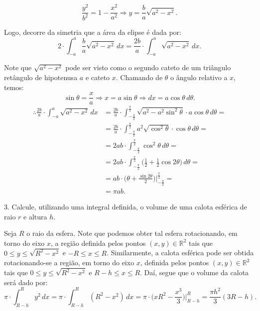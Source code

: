 \documentclass{article}
\begin{document}
{\begin{newpage}
\begin{equation*}\displaystyle{\frac{y^2}{b^2} = 1 - \frac{x^2}{a^2} \Rightarrow y = \frac{b}{a}\sqrt{a^{2} - x^{2}} .}\end{equation*}
\par Logo, decorre da simetria que a área da elipse é dada por:
\begin{equation*}\displaystyle{2\cdot\int_{-a}^{a}\frac{b}{a}\sqrt{a^2 - x^2}\, dx = \frac{2b}{a}\cdot\int_{-a}^{a} \sqrt{a^2 - x^2}\, dx .}\end{equation*}
\par Note que $\displaystyle{\sqrt{a^2 - x^2}}$ pode ser visto como o segundo cateto de um triângulo retângulo de hipotenusa $a$ e cateto $x$. Chamando de $\theta $ o ângulo relativo a $x$, temos:
\begin{equation*}\displaystyle{\sin{\theta } = \frac{x}{a} \Rightarrow x = a\sin{\theta } \Rightarrow dx = a\cos{\theta }\, d\theta .}\end{equation*}
$$\displaystyle{\begin{split}\therefore \frac{2b}{a}\cdot\int_{-a}^{a} \sqrt{a^2 - x^2}\, dx &= \frac{2b}{a}\cdot\int_{-\frac{\pi }{2}}^{\frac{\pi }{2}} \sqrt{a^2 - a^{2}\sin^{2}{\theta }} \cdot a\cos{\theta } \, d\theta = \\ &= \frac{2b}{a}\cdot\int_{-\frac{\pi }{2}}^{\frac{\pi }{2}} a^{2}\sqrt{\cos^{2}{\theta }} \cdot\cos{\theta }\, d\theta = \\ &= 2ab\cdot\int_{-\frac{\pi }{2}}^{\frac{\pi }{2}} \cos^{2}{\theta }\, d\theta = \\ &= 2ab\cdot\int_{-\frac{\pi }{2}}^{\frac{\pi }{2}} \Big(\frac{1}{2} + \frac{1}{2}\cos{2\theta }\Big)\,  d\theta = \\ &= ab\cdot\Big(\theta + \frac{\sin{2\theta }}{2}\Big)\Big|_{-\frac{\pi }{2}}^{\frac{\pi }{2}} = \\ &= \pi ab .\end{split}}$$
\par
\vspace{0.3cm}
\begin{flushleft}
3. Calcule, utilizando uma integral definida, o volume de uma calota esférica de raio $r$ e altura $h$.
\end{flushleft}
\par
Seja $R$ o raio da esfera. Note que podemos obter tal esfera rotacionando, em torno do eixo $x$, a região definida pelos pontos $(x,y)\in\mathbb{R}^2$ tais que $\displaystyle{0\leq y \leq\sqrt{R^{2} - x^{2}}}$ e $\displaystyle{-R\leq x\leq R}$. Similarmente, a calota esférica pode ser obtida rotacionando-se a região, em torno do eixo $x$, definida pelos pontos $(x,y)\in\mathbb{R}^2$ tais que $\displaystyle{0\leq y\leq\sqrt{R^{2} - x^{2}}}$ e $\displaystyle{R-h \leq x \leq R}$. Daí, segue que o volume da calota será dado por:
\begin{equation*}\displaystyle{\pi\cdot\int_{R-h}^{R} y^{2}\, dx = \pi\cdot\int_{R-h}^{R} (R^{2} - x^{2})\, dx = \pi\cdot\Big(xR^{2} - \frac{x^3}{3}\Big)\Big|_{R-h}^{R} = \frac{\pi h^{2}}{3}(3R - h).}\end{equation*}

\end{newpage}}
\end{document}
